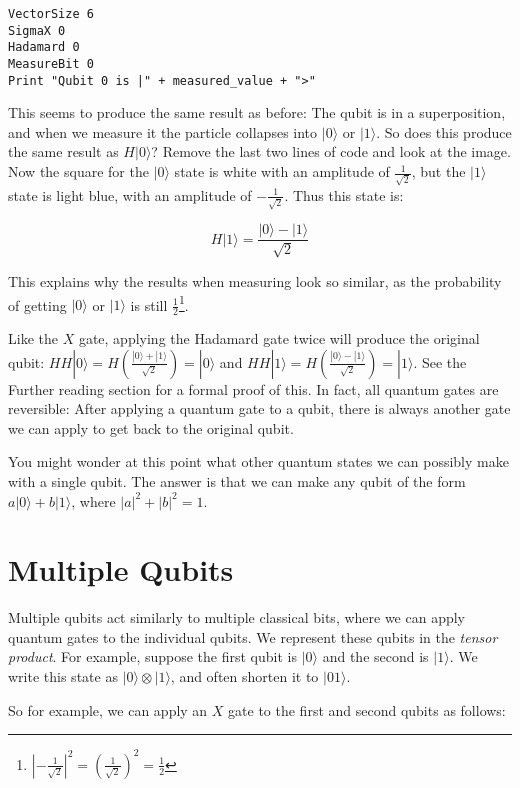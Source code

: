 \documentclass[twocolumn]{article}
\begin{document}
\begin{lstlisting}
VectorSize 6
SigmaX 0
Hadamard 0
MeasureBit 0
Print "Qubit 0 is |" + measured_value + ">"
\end{lstlisting}

This seems to produce the same result as before: The qubit is in a superposition, and when we measure it the particle collapses into $|0\rangle$ or $|1\rangle$. So does this produce the same result as $H|0\rangle$? Remove the last two lines of code and look at the image. Now the square for the $|0\rangle$ state is white with an amplitude of $\frac{1}{\sqrt{2}}$, but the $|1\rangle$ state is light blue, with an amplitude of $-\frac{1}{\sqrt{2}}$. Thus this state is:

$$H|1\rangle = \frac{|0\rangle - |1\rangle}{\sqrt{2}}$$

This explains why the results when measuring look so similar, as the probability of getting $|0\rangle$ or $|1\rangle$ is still $\frac{1}{2}$\footnote{$|-\frac{1}{\sqrt{2}}|^2 = (\frac{1}{\sqrt{2}})^2 = \frac{1}{2}$}.

Like the $X$ gate, applying the Hadamard gate twice will produce the original qubit: $HH|0\rangle = H\left(\frac{|0\rangle + |1\rangle}{\sqrt{2}}\right) = |0\rangle$ and $HH|1\rangle = H\left(\frac{|0\rangle - |1\rangle}{\sqrt{2}}\right) = |1\rangle$. See the Further reading section for a formal proof of this. In fact, all quantum gates are reversible: After applying a quantum gate to a qubit, there is always another gate we can apply to get back to the original qubit.

You might wonder at this point what other quantum states we can possibly make with a single qubit. The answer is that we can make any qubit of the form $a|0\rangle + b|1\rangle$, where $|a|^2 + |b|^2 = 1$.

\section{Multiple Qubits}

Multiple qubits act similarly to multiple classical bits, where we can apply quantum gates to the individual qubits. We represent these qubits in the {\em tensor product}. For example, suppose the first qubit is $|0\rangle$ and the second is $|1\rangle$. We write this state as $|0\rangle \otimes |1\rangle$, and often shorten it to $|01\rangle$.

So for example, we can apply an $X$ gate to the first and second qubits as follows:
\end{document}
